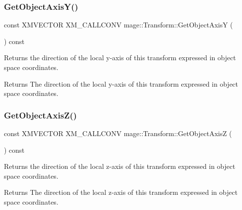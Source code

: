 \subsubsection{\texorpdfstring{Get\+Object\+Axis\+Y()}{GetObjectAxisY()}}
{\footnotesize\ttfamily const X\+M\+V\+E\+C\+T\+OR X\+M\+\_\+\+C\+A\+L\+L\+C\+O\+NV mage\+::\+Transform\+::\+Get\+Object\+AxisY (\begin{DoxyParamCaption}{ }\end{DoxyParamCaption}) const\hspace{0.3cm}{\ttfamily [noexcept]}}

Returns the direction of the local y-\/axis of this transform expressed in object space coordinates.

\begin{DoxyReturn}{Returns}
The direction of the local y-\/axis of this transform expressed in object space coordinates. 
\end{DoxyReturn}
\mbox{\label{classmage_1_1_transform_a404fdd1491f8f35376a78f7bd96d09b2}} 
\subsubsection{\texorpdfstring{Get\+Object\+Axis\+Z()}{GetObjectAxisZ()}}
{\footnotesize\ttfamily const X\+M\+V\+E\+C\+T\+OR X\+M\+\_\+\+C\+A\+L\+L\+C\+O\+NV mage\+::\+Transform\+::\+Get\+Object\+AxisZ (\begin{DoxyParamCaption}{ }\end{DoxyParamCaption}) const\hspace{0.3cm}{\ttfamily [noexcept]}}

Returns the direction of the local z-\/axis of this transform expressed in object space coordinates.

\begin{DoxyReturn}{Returns}
The direction of the local z-\/axis of this transform expressed in object space coordinates. 
\end{DoxyReturn}
\mbox{\label{classmage_1_1_transform_ab0920e283e8f21d2ca766c2409993ee4}} 
